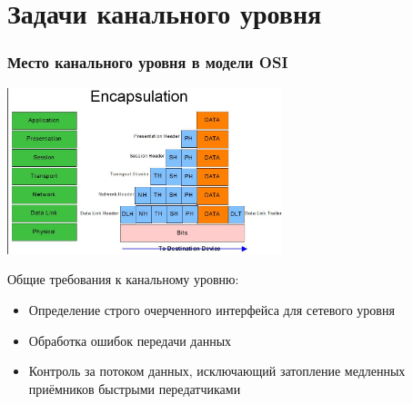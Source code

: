 \documentclass[utf8]{beamer}
\begin{document}
\section{Задачи канального уровня}
\begin{frame}
\frametitle{Место канального уровня в модели OSI}
\begin{center}
\includegraphics[width=0.6\textwidth]{pic/encapsulation.jpg}
\end{center}
Общие требования к канальному уровню:
\begin{itemize}
	\item Определение строго очерченного интерфейса для сетевого уровня
	\item Обработка ошибок передачи данных
	\item Контроль за потоком данных, исключающий затопление медленных приёмников быстрыми передатчиками
\end{itemize}
\end{frame}
\end{document}
